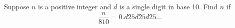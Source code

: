 Suppose $n$ is a positive integer and $d$ is a single digit in base 10. Find $n$ if \[ \frac{n}{810}=0.d25d25d25\ldots  \]